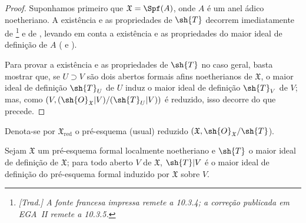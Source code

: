 \documentclass[oneside]{amsart}
\newcommand{\oldpage}[2][]{{\marginnote{\normalfont\textbf{#1}~|~#2}}\ignorespaces}
\let\EGAOriginalLabel\label
\renewcommand{\label}[1]{\phantomsection\EGAOriginalLabel{#1}}
\begin{document}
\begin{proof}
Suponhamos primeiro que $\mathfrak{X}=\Spf(A)$, onde $A$ é um anel ádico noetheriano.
A existência e as propriedades de $\sh{T}$ decorrem imediatamente de \footnote{\emph{[Trad.] A fonte francesa impressa remete a 10.3.4; a correção publicada em EGA~II remete a 10.3.5.}} e de , levando em conta a existência e as propriedades do maior ideal de definição de $A$ ( e ).

Para provar a existência e as propriedades de $\sh{T}$ no caso geral, basta mostrar que, se $U\supset V$ são dois abertos formais afins noetherianos de $\mathfrak{X}$, o maior ideal de definição $\sh{T}_U$ de $U$ induz o maior ideal de definição $\sh{T}_V$ de $V$; mas, como $(V,(\sh{O}_\mathfrak{X}|V)/(\sh{T}_U|V))$ é reduzido, isso decorre do que precede.
\end{proof}

Denota-se por $\mathfrak{X}_\text{red}$ o pré-esquema (usual) reduzido $(\mathfrak{X},\sh{O}_\mathfrak{X}/\sh{T}$).

\begin{corollary}[10.5.5]
\label{I.10.5.5}
Sejam $\mathfrak{X}$ um pré-esquema formal localmente noetheriano e $\sh{T}$ o maior ideal de definição de $\mathfrak{X}$; para todo aberto $V$ de $\mathfrak{X}$, $\sh{T}|V$ é o maior ideal de definição do pré-esquema formal induzido por $\mathfrak{X}$ sobre $V$.
\end{corollary}

\oldpage[I]{188}
\end{document}
